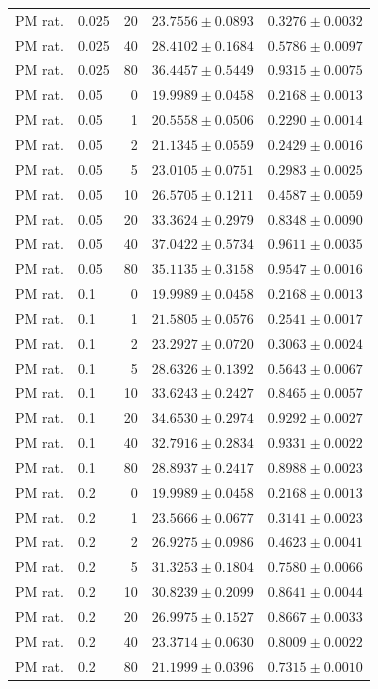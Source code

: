 \begin{longtable}{llrll}
PM rat. & 0.025 & 20 & $23.7556 \pm 0.0893$ & $0.3276 \pm 0.0032$ \\
PM rat. & 0.025 & 40 & $28.4102 \pm 0.1684$ & $0.5786 \pm 0.0097$ \\
PM rat. & 0.025 & 80 & $36.4457 \pm 0.5449$ & $0.9315 \pm 0.0075$ \\
PM rat. & 0.05 & 0 & $19.9989 \pm 0.0458$ & $0.2168 \pm 0.0013$ \\
PM rat. & 0.05 & 1 & $20.5558 \pm 0.0506$ & $0.2290 \pm 0.0014$ \\
PM rat. & 0.05 & 2 & $21.1345 \pm 0.0559$ & $0.2429 \pm 0.0016$ \\
PM rat. & 0.05 & 5 & $23.0105 \pm 0.0751$ & $0.2983 \pm 0.0025$ \\
PM rat. & 0.05 & 10 & $26.5705 \pm 0.1211$ & $0.4587 \pm 0.0059$ \\
PM rat. & 0.05 & 20 & $33.3624 \pm 0.2979$ & $0.8348 \pm 0.0090$ \\
PM rat. & 0.05 & 40 & $37.0422 \pm 0.5734$ & $0.9611 \pm 0.0035$ \\
PM rat. & 0.05 & 80 & $35.1135 \pm 0.3158$ & $0.9547 \pm 0.0016$ \\
PM rat. & 0.1 & 0 & $19.9989 \pm 0.0458$ & $0.2168 \pm 0.0013$ \\
PM rat. & 0.1 & 1 & $21.5805 \pm 0.0576$ & $0.2541 \pm 0.0017$ \\
PM rat. & 0.1 & 2 & $23.2927 \pm 0.0720$ & $0.3063 \pm 0.0024$ \\
PM rat. & 0.1 & 5 & $28.6326 \pm 0.1392$ & $0.5643 \pm 0.0067$ \\
PM rat. & 0.1 & 10 & $33.6243 \pm 0.2427$ & $0.8465 \pm 0.0057$ \\
PM rat. & 0.1 & 20 & $34.6530 \pm 0.2974$ & $0.9292 \pm 0.0027$ \\
PM rat. & 0.1 & 40 & $32.7916 \pm 0.2834$ & $0.9331 \pm 0.0022$ \\
PM rat. & 0.1 & 80 & $28.8937 \pm 0.2417$ & $0.8988 \pm 0.0023$ \\
PM rat. & 0.2 & 0 & $19.9989 \pm 0.0458$ & $0.2168 \pm 0.0013$ \\
PM rat. & 0.2 & 1 & $23.5666 \pm 0.0677$ & $0.3141 \pm 0.0023$ \\
PM rat. & 0.2 & 2 & $26.9275 \pm 0.0986$ & $0.4623 \pm 0.0041$ \\
PM rat. & 0.2 & 5 & $31.3253 \pm 0.1804$ & $0.7580 \pm 0.0066$ \\
PM rat. & 0.2 & 10 & $30.8239 \pm 0.2099$ & $0.8641 \pm 0.0044$ \\
PM rat. & 0.2 & 20 & $26.9975 \pm 0.1527$ & $0.8667 \pm 0.0033$ \\
PM rat. & 0.2 & 40 & $23.3714 \pm 0.0630$ & $0.8009 \pm 0.0022$ \\
PM rat. & 0.2 & 80 & $21.1999 \pm 0.0396$ & $0.7315 \pm 0.0010$ \\
\end{longtable}

